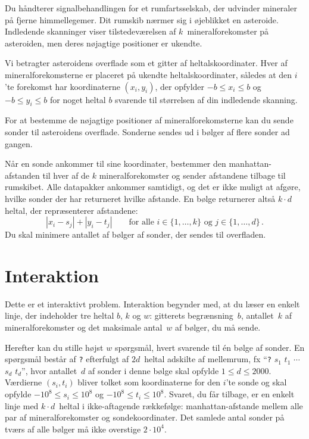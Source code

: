 

\noindent
Du håndterer signalbehandlingen for et rumfartsselskab,
der udvinder mineraler på fjerne himmellegemer.
Dit rumskib nærmer sig i øjeblikket en asteroide.
Indledende skanninger viser tilstedeværelsen af $k$~mineralforekomster på asteroiden, men deres nøjagtige positioner er ukendte.

\medskip

Vi betragter asteroidens overflade som et gitter af heltalskoordinater.
Hver af mineralforekomsterne er placeret på ukendte heltalskoordinater, 
således at den $i$'te forekomst har koordinaterne $(x_i, y_i)$, der opfylder
$-b \le x_i \le b$ og $-b\le y_i \le b$ %
for noget heltal $b$ svarende til størrelsen af din indledende skanning.

For at bestemme de nøjagtige positioner af mineralforekomsterne kan du sende sonder til asteroidens overflade. 
Sonderne sendes ud i bølger af flere sonder ad gangen.

Når en sonde ankommer til sine koordinater, bestemmer den manhattan-afstanden til hver af de $k$ mineralforekomster og sender afstandene tilbage til rumskibet.
Alle datapakker ankommer samtidigt, og det er ikke muligt at afgøre, hvilke sonder der har returneret hvilke afstande. 
En bølge returnerer altså $k\cdot d$ heltal, der repræsenterer afstandene:
\[
|x_i-s_j| + |y_i - t_j| \qquad\text{for alle } i \in \{1,\ldots,k\} \text{ og } j \in\{ 1,\ldots,d\}\,.
\]
Du skal minimere antallet af bølger af sonder, der sendes til overfladen.

\section*{Interaktion}

Dette er et interaktivt problem.
Interaktion begynder med, at du læser en enkelt linje, der indeholder tre heltal $b$, $k$ og $w$:
gitterets begrænsning~$b$,
antallet~$k$ af mineralforekomster og
det maksimale antal~$w$ af bølger, du må sende.

Herefter kan du stille højst $w$ spørgsmål, hvert svarende til én bølge af sonder.
En spørgsmål består af \texttt{?} efterfulgt af $2d$~heltal adskilte af mellemrum, fx ``\texttt{?} $s_1$ $t_1$ $\cdots$ $s_d$ $t_d$'', hvor antallet~$d$ af sonder i denne bølge skal opfylde
$1\leq d\leq 2000$. %
Værdierne $(s_i,t_i)$ bliver tolket som koordinaterne for den $i$'te sonde og skal opfylde 
$-10^8 \leq s_i \leq 10^8$ og $-10^8 \leq t_i \leq 10^8$. %
Svaret, du får tilbage, er en enkelt linje med $k \cdot d$~heltal i ikke-aftagende rækkefølge:
manhattan-afstande mellem alle par af mineralforekomster og sondekoordinater.
Det samlede antal sonder på tværs af alle bølger må ikke overstige
$2\cdot 10^4$. %

